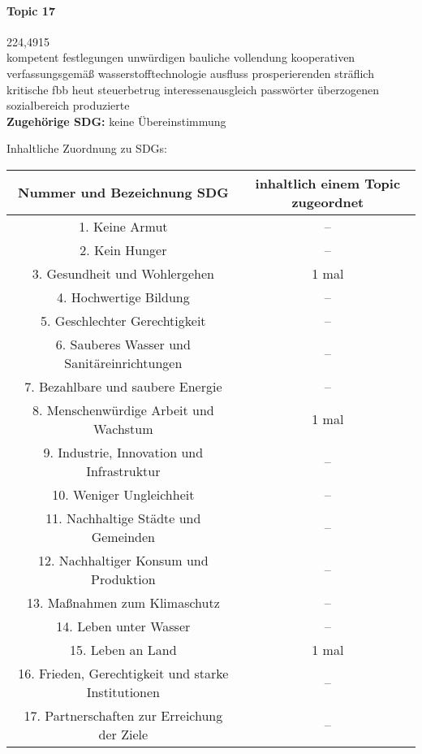 \documentclass[a4paper,11pt]{article}
\begin{document}
\paragraph{Topic 17} 224,4915 \\
kompetent festlegungen unwürdigen bauliche vollendung kooperativen
verfassungsgemäß wasserstofftechnologie ausfluss prosperierenden sträflich
kritische fbb heut steuerbetrug interessenausgleich passwörter überzogenen
sozialbereich produzierte \\ 
\textbf{Zugehörige SDG:} keine Übereinstimmung 
      
Inhaltliche Zuordnung zu SDGs: 
\begin{center}
\begin{tabular}{ |c|c|} \hline
Nummer und Bezeichnung SDG & inhaltlich einem Topic zugeordnet\\\hline
1. Keine Armut & -- \\\hline 
2. Kein Hunger & -- \\\hline
3. Gesundheit und Wohlergehen & 1 mal \\\hline
4. Hochwertige Bildung & --  \\\hline 
5. Geschlechter Gerechtigkeit & -- \\\hline
6. Sauberes Wasser und Sanitäreinrichtungen & -- \\\hline
7. Bezahlbare und saubere Energie & -- \\\hline 
8. Menschenwürdige Arbeit und Wachstum & 1 mal \\\hline 
9. Industrie, Innovation und Infrastruktur & -- \\\hline 
10. Weniger Ungleichheit & -- \\\hline 
11. Nachhaltige Städte und Gemeinden & -- \\\hline 
12. Nachhaltiger Konsum und Produktion & -- \\\hline 
13. Maßnahmen zum Klimaschutz & -- \\\hline 
14. Leben unter Wasser & -- \\\hline 
15. Leben an Land & 1 mal \\\hline 
16. Frieden, Gerechtigkeit und starke Institutionen & -- \\\hline 
17. Partnerschaften zur Erreichung der Ziele & -- \\\hline 
\end{tabular}
\end{center}
\end{document}
